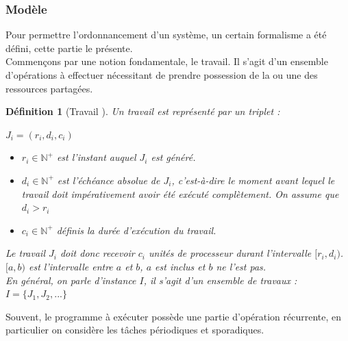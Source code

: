 \documentclass[a4paper]{report}
\theoremstyle{break}
\newtheorem{defin}{Définition}
\begin{document}
\subsubsection{Modèle}
Pour permettre l'ordonnancement d'un système, un certain formalisme a été défini, cette partie le présente.\\

Commençons par une notion fondamentale, le travail. Il s'agit d'un ensemble d'opérations à effectuer nécessitant de prendre possession de la ou une des ressources partagées.

\begin{defin}[Travail \cite{goossens2014os}]
Un travail est représenté par un triplet : 
\begin{center}
$J_i = (r_i, d_i, c_i)$
\end{center}
\begin{itemize}
\item $r_i \in \mathbb{N}^{+}$ est l'instant auquel $J_i$ est généré.
\item $d_i \in \mathbb{N}^{+}$ est l'échéance absolue de $J_i$, c'est-à-dire le moment avant lequel le travail doit impérativement avoir été exécuté complètement. On assume que $d_i > r_i$
\item $c_i \in \mathbb{N}^{+}$ définis la durée d'exécution du travail.
\end{itemize}
Le travail $J_i$ doit donc recevoir $c_i$ unités de processeur durant l'intervalle $[r_i, d_i)$. $[a,b)$ est l'intervalle entre $a$ et $b$, $a$ est inclus et $b$ ne l'est pas. \\
En général, on parle d'instance $I$, il s'agit d'un ensemble de travaux : $ I = \{J_1, J_2, ...\} $
\end{defin}

Souvent, le programme à exécuter possède une partie d'opération récurrente, en particulier on considère les tâches périodiques et sporadiques.
\end{document}
